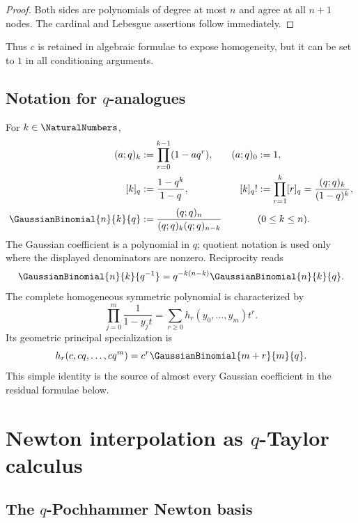 \begin{proof}
Both sides are polynomials of degree at most $n$ and agree at all $n+1$
nodes.  The cardinal and Lebesgue assertions follow immediately.
\end{proof}

Thus $c$ is retained in algebraic formulae to expose homogeneity, but it can
be set to $1$ in all conditioning arguments.

\subsection{Notation for \texorpdfstring{$q$}{q}-analogues}

For $k\in\NaturalNumbers$,
\begin{align}
 (a;q)_k&:=\prod_{r=0}^{k-1}(1-aq^r),
 & (a;q)_0&:=1,\\
 [k]_q&:=\frac{1-q^k}{1-q},
 & [k]_q!&:=\prod_{r=1}^k[r]_q=\frac{(q;q)_k}{(1-q)^k},\\
 \GaussianBinomial{n}{k}{q}&:=\frac{(q;q)_n}{(q;q)_k(q;q)_{n-k}}
 &&(0\le k\le n).
\end{align}
The Gaussian coefficient is a polynomial in $q$; quotient notation is used
only where the displayed denominators are nonzero.  Reciprocity reads
\begin{equation}
 \GaussianBinomial{n}{k}{q^{-1}}=q^{-k(n-k)}\GaussianBinomial{n}{k}{q}.
 \label{gq:eq:q-reciprocity}
\end{equation}
The complete homogeneous symmetric polynomial is characterized by
\begin{equation}
 \prod_{j=0}^m\frac1{1-y_jt}
 =\sum_{r\ge0}h_r(y_0,\ldots,y_m)t^r.
 \label{gq:eq:h-generating}
\end{equation}
Its geometric principal specialization is
\begin{equation}
 h_r(c,cq,\ldots,cq^m)=c^r\GaussianBinomial{m+r}{m}{q}.
 \label{gq:eq:h-principal}
\end{equation}
This simple identity is the source of almost every Gaussian coefficient in
the residual formulae below.

\section{Newton interpolation as \texorpdfstring{$q$}{q}-Taylor calculus}
\label{gq:chap:q-newton}

\subsection{The \texorpdfstring{$q$}{q}-Pochhammer Newton basis}

